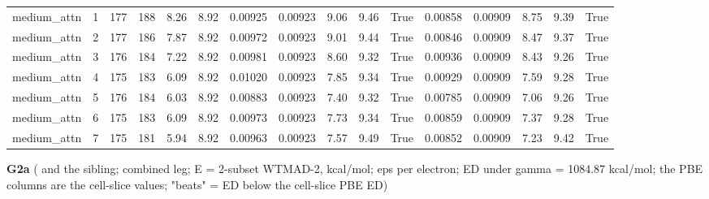 \documentclass[10pt,a4paper]{article}
\begin{document}
\begin{landscape}
\begin{tiny}
\begin{longtable}{llllllllllllllll}
medium\_attn & 1 & 177 & 188 & 8.26 & 8.92 & 0.00925 & 0.00923 & 9.06 & 9.46 & True & 0.00858 & 0.00909 & 8.75 & 9.39 & True \\
medium\_attn & 2 & 177 & 186 & 7.87 & 8.92 & 0.00972 & 0.00923 & 9.01 & 9.44 & True & 0.00846 & 0.00909 & 8.47 & 9.37 & True \\
medium\_attn & 3 & 176 & 184 & 7.22 & 8.92 & 0.00981 & 0.00923 & 8.60 & 9.32 & True & 0.00936 & 0.00909 & 8.43 & 9.26 & True \\
medium\_attn & 4 & 175 & 183 & 6.09 & 8.92 & 0.01020 & 0.00923 & 7.85 & 9.34 & True & 0.00929 & 0.00909 & 7.59 & 9.28 & True \\
medium\_attn & 5 & 176 & 184 & 6.03 & 8.92 & 0.00883 & 0.00923 & 7.40 & 9.32 & True & 0.00785 & 0.00909 & 7.06 & 9.26 & True \\
medium\_attn & 6 & 175 & 183 & 6.09 & 8.92 & 0.00973 & 0.00923 & 7.73 & 9.34 & True & 0.00859 & 0.00909 & 7.37 & 9.28 & True \\
medium\_attn & 7 & 175 & 181 & 5.94 & 8.92 & 0.00963 & 0.00923 & 7.57 & 9.49 & True & 0.00852 & 0.00909 & 7.23 & 9.42 & True \\
\bottomrule \end{longtable}
\end{tiny}
\end{landscape}

\textbf{G2a} ( and the  sibling; combined leg; E = 2-subset WTMAD-2, kcal/mol; eps per electron; ED under gamma = 1084.87 kcal/mol; the PBE columns are the cell-slice values; "beats" = ED below the cell-slice PBE ED)
\end{document}
